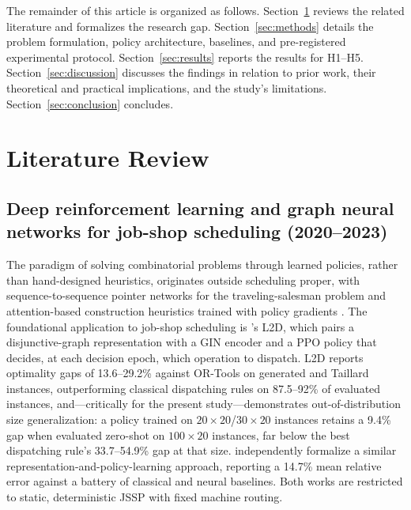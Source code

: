 \documentclass[11pt]{article}
\begin{document}
The remainder of this article is organized as follows. Section~\ref{sec:litrev} reviews the related literature and formalizes the research gap. Section~\ref{sec:methods} details the problem formulation, policy architecture, baselines, and pre-registered experimental protocol. Section~\ref{sec:results} reports the results for H1--H5. Section~\ref{sec:discussion} discusses the findings in relation to prior work, their theoretical and practical implications, and the study's limitations. Section~\ref{sec:conclusion} concludes.

\section{Literature Review}
\label{sec:litrev}

\subsection{Deep reinforcement learning and graph neural networks for job-shop scheduling (2020--2023)}

The paradigm of solving combinatorial problems through learned policies, rather than hand-designed heuristics, originates outside scheduling proper, with sequence-to-sequence pointer networks for the traveling-salesman problem \citep{vinyals2015pointer} and attention-based construction heuristics trained with policy gradients \citep{kool2019attention,kwon2020pomo}. The foundational application to job-shop scheduling is \citet{zhang2020l2d}'s L2D, which pairs a disjunctive-graph representation with a GIN encoder \citep{xu2019gin} and a PPO policy that decides, at each decision epoch, which operation to dispatch. L2D reports optimality gaps of 13.6--29.2\% against OR-Tools on generated and Taillard \citep{taillard1993} instances, outperforming classical dispatching rules on 87.5--92\% of evaluated instances, and---critically for the present study---demonstrates out-of-distribution size generalization: a policy trained on $20\times20$/$30\times20$ instances retains a 9.4\% gap when evaluated zero-shot on $100\times20$ instances, far below the best dispatching rule's 33.7--54.9\% gap at that size. \citet{park2021} independently formalize a similar representation-and-policy-learning approach, reporting a 14.7\% mean relative error against a battery of classical and neural baselines. Both works are restricted to static, deterministic JSSP with fixed machine routing.
\end{document}
